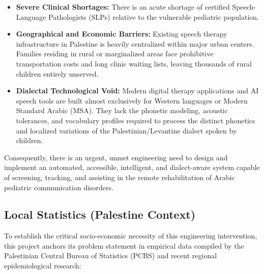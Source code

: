 \documentclass[
  letterpaper,
  DIV=11,
  numbers=noendperiod]{scrartcl}
\providecommand{\tightlist}{%
  \setlength{\itemsep}{0pt}\setlength{\parskip}{0pt}}
\begin{document}
\begin{itemize}
\tightlist
\item
  \textbf{Severe Clinical Shortages:} There is an acute shortage of
  certified Speech-Language Pathologists (SLPs) relative to the
  vulnerable pediatric population.
\item
  \textbf{Geographical and Economic Barriers:} Existing speech therapy
  infrastructure in Palestine is heavily centralized within major urban
  centers. Families residing in rural or marginalized areas face
  prohibitive transportation costs and long clinic waiting lists,
  leaving thousands of rural children entirely unserved.
\item
  \textbf{Dialectal Technological Void:} Modern digital therapy
  applications and AI speech tools are built almost exclusively for
  Western languages or Modern Standard Arabic (MSA). They lack the
  phonetic modeling, acoustic tolerances, and vocabulary profiles
  required to process the distinct phonetics and localized variations of
  the Palestinian/Levantine dialect spoken by children.
\end{itemize}

Consequently, there is an urgent, unmet engineering need to design and
implement an automated, accessible, intelligent, and dialect-aware
system capable of screening, tracking, and assisting in the remote
rehabilitation of Arabic pediatric communication disorders.

\subsection{Local Statistics (Palestine
Context)}\label{local-statistics-palestine-context}

To establish the critical socio-economic necessity of this engineering
intervention, this project anchors its problem statement in empirical
data compiled by the Palestinian Central Bureau of Statistics (PCBS) and
recent regional epidemiological research:
\end{document}
